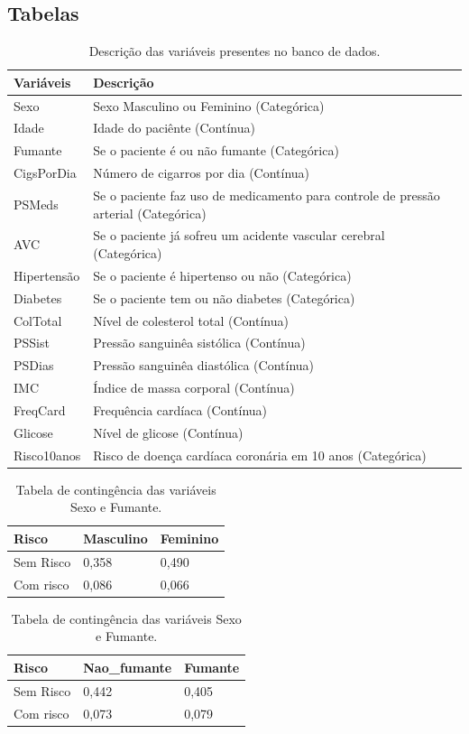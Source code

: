 \documentclass[
  12pt,
]{article}
\begin{document}
\subsection{Tabelas}

\begin{table}[H]

\caption{\label{tab:vars}Descrição das variáveis presentes no banco de dados.}
\centering
\fontsize{10}{12}\selectfont
\begin{tabular}[t]{ll}
\toprule
Variáveis & Descrição\\
\midrule
Sexo & Sexo Masculino ou Feminino (Categórica)\\
Idade & Idade do paciênte (Contínua)\\
Fumante & Se o paciente é ou não fumante (Categórica)\\
CigsPorDia & Número de cigarros por dia (Contínua)\\
PSMeds & Se o paciente faz uso de medicamento para controle de pressão arterial (Categórica)\\
AVC & Se o paciente já sofreu um acidente vascular cerebral (Categórica)\\
Hipertensão & Se o paciente é hipertenso ou não (Categórica)\\
Diabetes & Se o paciente tem ou não diabetes (Categórica)\\
ColTotal & Nível de colesterol total (Contínua)\\
PSSist & Pressão sanguinêa sistólica (Contínua)\\
PSDias & Pressão sanguinêa diastólica (Contínua)\\
IMC & Índice de massa corporal (Contínua)\\
FreqCard & Frequência cardíaca (Contínua)\\
Glicose & Nível de glicose (Contínua)\\
Risco10anos & Risco de doença cardíaca coronária em 10 anos (Categórica)\\
\bottomrule
\end{tabular}
\end{table}

\begin{table}[H]
\caption{\label{tab:sex}Tabela de contingência das variáveis Sexo e Fumante.}

\centering
\fontsize{10}{12}\selectfont
\begin{tabular}[t]{lll}
\toprule
Risco & Masculino & Feminino\\
\midrule
Sem Risco & 0,358 & 0,490\\
Com risco & 0,086 & 0,066\\
\bottomrule
\end{tabular}
\centering
\begin{tabular}[t]{lll}
\toprule
Risco & Nao\_fumante & Fumante\\
\midrule
Sem Risco & 0,442 & 0,405\\
Com risco & 0,073 & 0,079\\
\bottomrule
\end{tabular}
\end{table}
\end{document}
